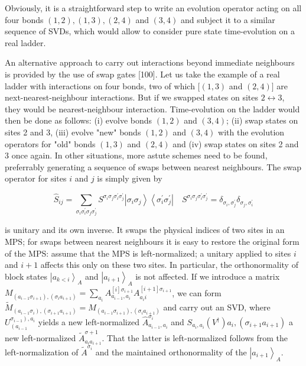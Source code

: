 \documentclass[12pt]{article}
\begin{document}
Obviously, it is a straightforward step to write an evolution operator acting on all four bonds $(1,2),(1,3),(2,4)$ and $(3,4)$ and subject it to a similar sequence of SVDs, which would allow to consider pure state time-evolution on a real ladder.

An alternative approach to carry out interactions beyond immediate neighbours is provided by the use of swap gates [100]. Let us take the example of a real ladder with interactions on four bonds, two of which $[(1,3)$ and $(2,4)]$ are next-nearest-neighbour interactions. But if we swapped states on sites $2 \leftrightarrow 3$, they would be nearest-neighbour interaction. Time-evolution on the ladder would then be done as follows: (i) evolve bonds $(1,2)$ and $(3,4)$; (ii) swap states on sites 2 and 3, (iii) evolve "new" bonds $(1,2)$ and $(3,4)$ with the evolution operators for "old" bonds $(1,3)$ and $(2,4)$ and (iv) swap states on sites 2 and 3 once again. In other situations, more astute schemes need to be found, preferrably generating a sequence of swaps between nearest neighbours. The swap operator for sites $i$ and $j$ is simply given by


\begin{equation*}
\hat{S}_{i j}=\sum_{\sigma_{i} \sigma_{i}^{\prime} \sigma_{j} \sigma_{j}^{\prime}} S^{\sigma_{i} \sigma_{j} \sigma_{i}^{\prime} \sigma_{j}^{\prime}}\left|\sigma_{i} \sigma_{j}\right\rangle\left\langle\sigma_{i}^{\prime} \sigma_{j}^{\prime}\right| \quad S^{\sigma_{i} \sigma_{j} \sigma_{i}^{\prime} \sigma_{j}^{\prime}}=\delta_{\sigma_{i}, \sigma_{j}^{\prime}} \delta_{\sigma_{j}, \sigma_{i}^{\prime}} \tag{253}
\end{equation*}


is unitary and its own inverse. It swaps the physical indices of two sites in an MPS; for swaps between nearest neighbours it is easy to restore the original form of the MPS: assume that the MPS is left-normalized; a unitary applied to sites $i$ and $i+1$ affects this only on these two sites. In particular, the orthonormality of block states $\left|a_{k<i}\right\rangle_{A}$ and $\left|a_{i+1}\right\rangle_{A}$ is not affected. If we introduce a matrix $M_{\left(a_{i-1} \sigma_{i+1}\right),\left(\sigma_{i} a_{i+1}\right)}=\sum_{a_{i}} A_{a_{i-1}, a_{i}}^{[i] \sigma_{i+1}} A_{a_{i} i}^{[i+1] \sigma_{i+1}}$, we can form $\tilde{M}_{\left(a_{i-1} \sigma_{i}\right),\left(\sigma_{i+1} a_{i+1}\right)}=M_{\left(a_{i-1} \sigma_{i+1}\right),\left(\sigma_{i} a_{i+1}\right)}$ and carry out an SVD, where $U_{\left(a_{i-1}\right.}^{\left.\sigma_{i-1}\right), a_{i}}$ yields a new left-normalized $\hat{A}_{a_{i-1}, a_{i}}^{\sigma_{i}}$ and $S_{a_{i}, a_{i}}\left(V^{\dagger}\right) a_{i},\left(\sigma_{i+1} a_{i+1}\right)$ a new left-normalized $\tilde{A}_{a_{i} a_{i+1}}^{\sigma+1}$. That the latter is left-normalized follows from the left-normalization of $\tilde{A}^{\sigma_{i}}$ and the maintained orthonormality of the $\left|a_{i+1}\right\rangle_{A}$.
\end{document}
